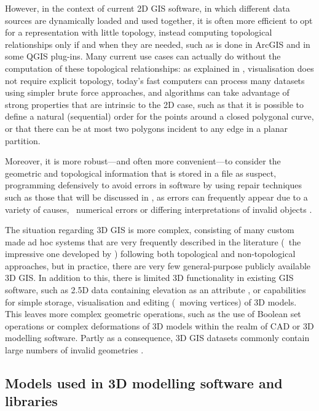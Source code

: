 However, in the context of current 2D GIS software, in which different data sources are dynamically loaded and used together, it is often more efficient to opt for a representation with little topology, instead computing topological relationships only if and when they are needed, such as is done in ArcGIS \citep{ESRITopology} and in some QGIS plug-ins.
Many current use cases can actually do without the computation of these topological relationships: as explained in , visualisation does not require explicit topology, today's fast computers can process many datasets using simpler brute force approaches, and algorithms can take advantage of strong properties that are intrinsic to the 2D case, such as that it is possible to define a natural (sequential) order for the points around a closed polygonal curve, or that there can be at most two polygons incident to any edge in a planar partition.

Moreover, it is more robust---and often more convenient---to consider the geometric and topological information that is stored in a file as suspect, programming defensively to avoid errors in software by using repair techniques such as those that will be discussed in , as errors can frequently appear due to a variety of causes, \eg\ numerical errors \citep{Goldberg91,Schirra97} or differing interpretations of invalid objects \citep{Ledoux14}.

The situation regarding 3D GIS is more complex, consisting of many custom made ad hoc systems that are very frequently described in the literature (\eg\ the impressive one developed by \citet{Zhang11}) following both topological and non-topological approaches, but in practice, there are very few general-purpose publicly available 3D GIS.\@
In addition to this, there is limited 3D functionality in existing GIS software, such as 2.5D data containing elevation as an attribute \citep{Raper89}, or capabilities for simple storage, visualisation and editing (\eg\ moving vertices) of 3D models.
This leaves more complex geometric operations, such as the use of Boolean set operations or complex deformations of 3D models within the realm of CAD or 3D modelling software.
Partly as a consequence, 3D GIS datasets commonly contain large numbers of invalid geometries \citep{Zhao14}.

\subsection{Models used in 3D modelling software and libraries}

